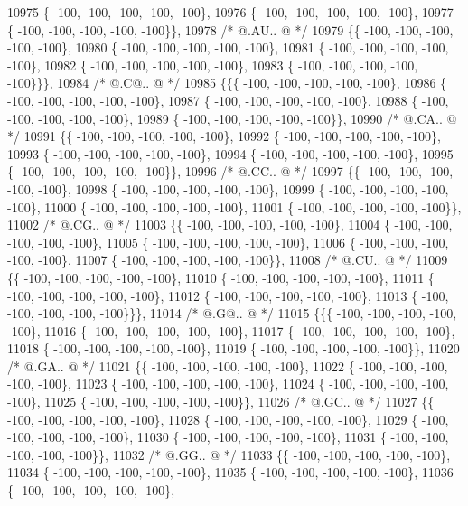 \begin{DoxyCode}
10975 \{ -100, -100, -100, -100, -100\},
10976 \{ -100, -100, -100, -100, -100\},
10977 \{ -100, -100, -100, -100, -100\}\},
10978 \textcolor{comment}{/*  @.AU.. @ */}
10979 \{\{ -100, -100, -100, -100, -100\},
10980 \{ -100, -100, -100, -100, -100\},
10981 \{ -100, -100, -100, -100, -100\},
10982 \{ -100, -100, -100, -100, -100\},
10983 \{ -100, -100, -100, -100, -100\}\}\},
10984 \textcolor{comment}{/*  @.C@.. @ */}
10985 \{\{\{ -100, -100, -100, -100, -100\},
10986 \{ -100, -100, -100, -100, -100\},
10987 \{ -100, -100, -100, -100, -100\},
10988 \{ -100, -100, -100, -100, -100\},
10989 \{ -100, -100, -100, -100, -100\}\},
10990 \textcolor{comment}{/*  @.CA.. @ */}
10991 \{\{ -100, -100, -100, -100, -100\},
10992 \{ -100, -100, -100, -100, -100\},
10993 \{ -100, -100, -100, -100, -100\},
10994 \{ -100, -100, -100, -100, -100\},
10995 \{ -100, -100, -100, -100, -100\}\},
10996 \textcolor{comment}{/*  @.CC.. @ */}
10997 \{\{ -100, -100, -100, -100, -100\},
10998 \{ -100, -100, -100, -100, -100\},
10999 \{ -100, -100, -100, -100, -100\},
11000 \{ -100, -100, -100, -100, -100\},
11001 \{ -100, -100, -100, -100, -100\}\},
11002 \textcolor{comment}{/*  @.CG.. @ */}
11003 \{\{ -100, -100, -100, -100, -100\},
11004 \{ -100, -100, -100, -100, -100\},
11005 \{ -100, -100, -100, -100, -100\},
11006 \{ -100, -100, -100, -100, -100\},
11007 \{ -100, -100, -100, -100, -100\}\},
11008 \textcolor{comment}{/*  @.CU.. @ */}
11009 \{\{ -100, -100, -100, -100, -100\},
11010 \{ -100, -100, -100, -100, -100\},
11011 \{ -100, -100, -100, -100, -100\},
11012 \{ -100, -100, -100, -100, -100\},
11013 \{ -100, -100, -100, -100, -100\}\}\},
11014 \textcolor{comment}{/*  @.G@.. @ */}
11015 \{\{\{ -100, -100, -100, -100, -100\},
11016 \{ -100, -100, -100, -100, -100\},
11017 \{ -100, -100, -100, -100, -100\},
11018 \{ -100, -100, -100, -100, -100\},
11019 \{ -100, -100, -100, -100, -100\}\},
11020 \textcolor{comment}{/*  @.GA.. @ */}
11021 \{\{ -100, -100, -100, -100, -100\},
11022 \{ -100, -100, -100, -100, -100\},
11023 \{ -100, -100, -100, -100, -100\},
11024 \{ -100, -100, -100, -100, -100\},
11025 \{ -100, -100, -100, -100, -100\}\},
11026 \textcolor{comment}{/*  @.GC.. @ */}
11027 \{\{ -100, -100, -100, -100, -100\},
11028 \{ -100, -100, -100, -100, -100\},
11029 \{ -100, -100, -100, -100, -100\},
11030 \{ -100, -100, -100, -100, -100\},
11031 \{ -100, -100, -100, -100, -100\}\},
11032 \textcolor{comment}{/*  @.GG.. @ */}
11033 \{\{ -100, -100, -100, -100, -100\},
11034 \{ -100, -100, -100, -100, -100\},
11035 \{ -100, -100, -100, -100, -100\},
11036 \{ -100, -100, -100, -100, -100\},

\end{DoxyCode}
